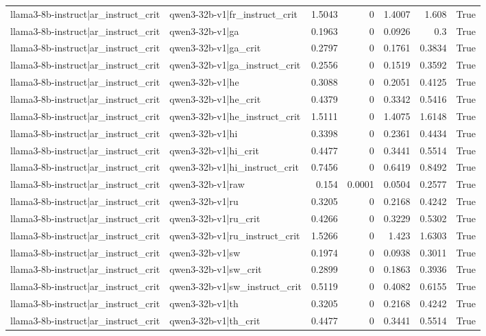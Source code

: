 \begin{table}
\begin{tabular}{l l r r r r l}
llama3-8b-instruct|ar_instruct_crit & qwen3-32b-v1|fr_instruct_crit & 1.5043 & 0 & 1.4007 & 1.608 & True \\
llama3-8b-instruct|ar_instruct_crit & qwen3-32b-v1|ga & 0.1963 & 0 & 0.0926 & 0.3 & True \\
llama3-8b-instruct|ar_instruct_crit & qwen3-32b-v1|ga_crit & 0.2797 & 0 & 0.1761 & 0.3834 & True \\
llama3-8b-instruct|ar_instruct_crit & qwen3-32b-v1|ga_instruct_crit & 0.2556 & 0 & 0.1519 & 0.3592 & True \\
llama3-8b-instruct|ar_instruct_crit & qwen3-32b-v1|he & 0.3088 & 0 & 0.2051 & 0.4125 & True \\
llama3-8b-instruct|ar_instruct_crit & qwen3-32b-v1|he_crit & 0.4379 & 0 & 0.3342 & 0.5416 & True \\
llama3-8b-instruct|ar_instruct_crit & qwen3-32b-v1|he_instruct_crit & 1.5111 & 0 & 1.4075 & 1.6148 & True \\
llama3-8b-instruct|ar_instruct_crit & qwen3-32b-v1|hi & 0.3398 & 0 & 0.2361 & 0.4434 & True \\
llama3-8b-instruct|ar_instruct_crit & qwen3-32b-v1|hi_crit & 0.4477 & 0 & 0.3441 & 0.5514 & True \\
llama3-8b-instruct|ar_instruct_crit & qwen3-32b-v1|hi_instruct_crit & 0.7456 & 0 & 0.6419 & 0.8492 & True \\
llama3-8b-instruct|ar_instruct_crit & qwen3-32b-v1|raw & 0.154 & 0.0001 & 0.0504 & 0.2577 & True \\
llama3-8b-instruct|ar_instruct_crit & qwen3-32b-v1|ru & 0.3205 & 0 & 0.2168 & 0.4242 & True \\
llama3-8b-instruct|ar_instruct_crit & qwen3-32b-v1|ru_crit & 0.4266 & 0 & 0.3229 & 0.5302 & True \\
llama3-8b-instruct|ar_instruct_crit & qwen3-32b-v1|ru_instruct_crit & 1.5266 & 0 & 1.423 & 1.6303 & True \\
llama3-8b-instruct|ar_instruct_crit & qwen3-32b-v1|sw & 0.1974 & 0 & 0.0938 & 0.3011 & True \\
llama3-8b-instruct|ar_instruct_crit & qwen3-32b-v1|sw_crit & 0.2899 & 0 & 0.1863 & 0.3936 & True \\
llama3-8b-instruct|ar_instruct_crit & qwen3-32b-v1|sw_instruct_crit & 0.5119 & 0 & 0.4082 & 0.6155 & True \\
llama3-8b-instruct|ar_instruct_crit & qwen3-32b-v1|th & 0.3205 & 0 & 0.2168 & 0.4242 & True \\
llama3-8b-instruct|ar_instruct_crit & qwen3-32b-v1|th_crit & 0.4477 & 0 & 0.3441 & 0.5514 & True \\

\end{tabular}
\end{table}

